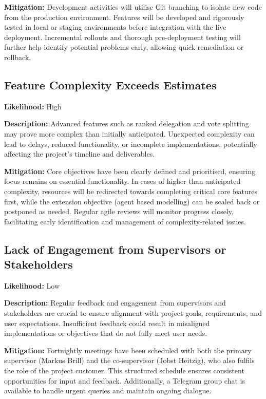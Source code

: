 \textbf{Mitigation:} Development activities will utilise Git branching to isolate new code from the production environment. Features will be developed and rigorously tested in local or staging environments before integration with the live deployment. Incremental rollouts and thorough pre-deployment testing will further help identify potential problems early, allowing quick remediation or rollback.

\subsection*{Feature Complexity Exceeds Estimates}

\textbf{Likelihood:} High

\textbf{Description:} Advanced features such as ranked delegation and vote splitting may prove more complex than initially anticipated. Unexpected complexity can lead to delays, reduced functionality, or incomplete implementations, potentially affecting the project's timeline and deliverables.

\textbf{Mitigation:} Core objectives have been clearly defined and prioritised, ensuring focus remains on essential functionality. In cases of higher than anticipated complexity, resources will be redirected towards completing critical core features first, while the extension objective (agent based modelling) can be scaled back or postponed as needed. Regular agile reviews will monitor progress closely, facilitating early identification and management of complexity-related issues.

\subsection*{Lack of Engagement from Supervisors or Stakeholders}

\textbf{Likelihood:} Low

\textbf{Description:} Regular feedback and engagement from supervisors and stakeholders are crucial to ensure alignment with project goals, requirements, and user expectations. Insufficient feedback could result in misaligned implementations or objectives that do not fully meet user needs.

\textbf{Mitigation:} Fortnightly meetings have been scheduled with both the primary supervisor (Markus Brill) and the co-supervisor (Jobst Heitzig), who also fulfils the role of the project customer. This structured schedule ensures consistent opportunities for input and feedback. Additionally, a Telegram group chat is available to handle urgent queries and maintain ongoing dialogue.

